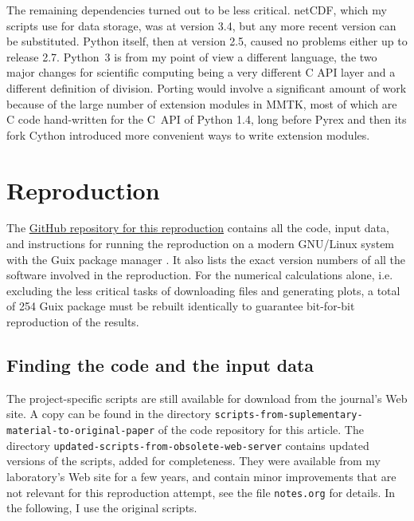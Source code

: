 The remaining dependencies turned out to be less critical. netCDF, which my scripts use for data storage, was at version 3.4, but any more recent version can be substituted. Python itself, then at version 2.5, caused no problems either up to release 2.7. Python~3 is from my point of view a different language, the two major changes for scientific computing being a very different C API layer and a different definition of division. Porting would involve a significant amount of work because of the large number of extension modules in MMTK, most of which are C code hand-written for the C~API of Python 1.4, long before Pyrex \cite{EwingPyrex2010} and then its fork Cython \cite{BehnelCythonBestBoth2011} introduced more convenient ways to write extension modules.

\section*{Reproduction}

The \href{https://github.com/khinsen/rescience-ten-year-challenge-paper-3}{GitHub repository for this reproduction} contains all the code, input data, and instructions for running the reproduction on a modern GNU/Linux system with the Guix package manager \cite{CourtesReproducibleUserControlledSoftware2015,WurmusPiGxreproduciblegenomics2018}. It also lists the exact version numbers of all the software involved in the reproduction. For the numerical calculations alone, i.e. excluding the less critical tasks of downloading files and generating plots, a total of 254 Guix package must be rebuilt identically to guarantee bit-for-bit reproduction of the results.

\subsection*{Finding the code and the input data}

The project-specific scripts are still available for download from the journal's Web site. A copy can be found in the directory \texttt{scripts-from-suplementary-material-to-original-paper} of the code repository for this article. The directory \texttt{updated-scripts-from-obsolete-web-server} contains updated versions of the scripts, added for completeness. They were available from my laboratory's Web site for a few years, and contain minor improvements that are not relevant for this reproduction attempt, see the file \texttt{notes.org} for details. In the following, I use the original scripts.

